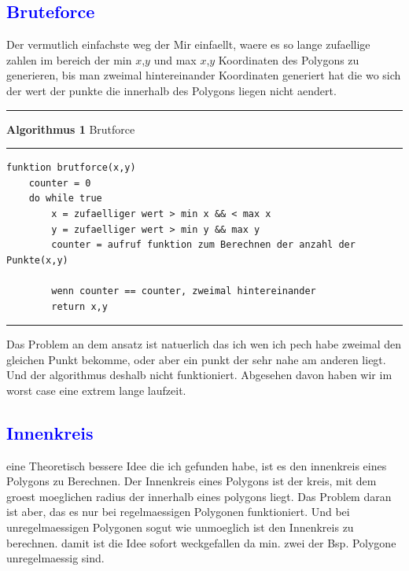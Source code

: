 \documentclass{article}
\begin{document}
\subsection{\textcolor{blue}{Bruteforce}}
Der vermutlich einfachste weg der Mir einfaellt, waere es so lange zufaellige zahlen im bereich der min $x$,$y$ und max $x$,$y$ Koordinaten des Polygons zu generieren, bis man zweimal hintereinander Koordinaten generiert hat die wo sich der wert der punkte die innerhalb des Polygons liegen nicht aendert.
\vspace{5pt}
\hrule
\vspace{1.5pt}
\large{\textbf{Algorithmus 1} Brutforce}
\vspace{1.5pt}
\hrule
\begin{verbatim}
funktion brutforce(x,y)
	counter = 0
	do while true
		x = zufaelliger wert > min x && < max x
		y = zufaelliger wert > min y && max y
		counter = aufruf funktion zum Berechnen der anzahl der Punkte(x,y)
		
		wenn counter == counter, zweimal hintereinander
		return x,y 
\end{verbatim}
\hrule
\vspace{5pt}
Das Problem an dem ansatz ist natuerlich das ich wen ich pech habe zweimal den gleichen Punkt bekomme, oder aber ein punkt der sehr nahe am anderen liegt. Und der algorithmus deshalb nicht funktioniert. Abgesehen davon haben wir im worst case eine extrem lange laufzeit.
\subsection{\textcolor{blue}{Innenkreis}}
eine Theoretisch bessere Idee die ich gefunden habe, ist es den innenkreis eines Polygons zu Berechnen. Der Innenkreis eines Polygons ist der kreis, mit dem groest moeglichen radius der innerhalb eines polygons liegt. Das Problem daran ist aber, das es nur bei regelmaessigen Polygonen funktioniert. Und bei unregelmaessigen Polygonen sogut wie unmoeglich ist den Innenkreis zu berechnen. damit ist die Idee sofort weckgefallen da min. zwei der Bsp. Polygone unregelmaessig sind.
\end{document}
